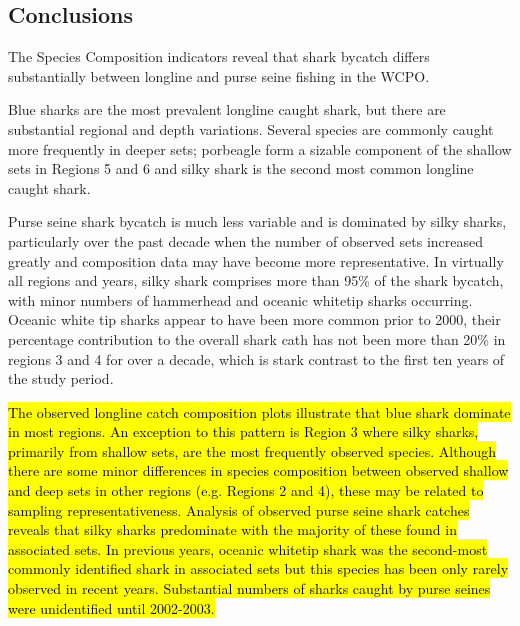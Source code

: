 \documentclass[12pt]{SCreport}
\begin{document}
 \subsection{Conclusions}

The Species Composition indicators reveal that shark bycatch differs substantially between longline and purse seine fishing in the WCPO.  

Blue sharks are the most prevalent longline caught shark, but there are substantial regional and depth variations.  Several species are commonly caught more frequently in deeper sets; porbeagle form a sizable component of the shallow sets in Regions 5 and 6 and silky shark is the second most common longline caught shark.

Purse seine shark bycatch is much less variable and is dominated by silky sharks, particularly over the past decade when the number of observed sets increased greatly and composition data may have become more representative.  In virtually all regions and years, silky shark comprises more than 95\% of the shark bycatch, with minor numbers of hammerhead and oceanic whitetip sharks occurring.  Oceanic white tip sharks appear to have been more common prior to 2000, their percentage contribution to the overall shark cath has not been more than 20\% in regions 3 and 4 for over a decade, which is stark contrast to the first ten years of the study period. 

 
\hl{ The observed longline catch composition plots illustrate that blue shark dominate in most regions. An exception to this pattern is Region 3 where silky sharks, primarily from shallow sets, are the most frequently observed species. Although there are some minor differences in species composition between observed shallow and deep sets in other regions (e.g. Regions 2 and 4), these may be related to sampling representativeness. Analysis of observed purse seine shark catches reveals that silky sharks predominate with the majority of these found in associated sets. In previous years, oceanic whitetip shark was the second-most commonly identified shark in associated sets but this species has been only rarely observed in recent years. Substantial numbers of sharks caught by purse seines were unidentified until 2002-2003.}
      
 \clearpage          

\end{document}
